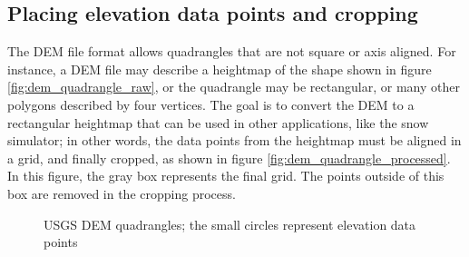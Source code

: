 \subsection{Placing elevation data points and cropping}
\label{sec:usgscropping}
The DEM file format allows quadrangles that are not square or axis aligned. For instance, a DEM file may describe a heightmap of the shape shown in figure \ref{fig:dem_quadrangle_raw}, or the quadrangle may be rectangular, or many other polygons described by four vertices. The goal is to convert the DEM to a rectangular heightmap that can be used in other applications, like the snow simulator; in other words, the data points from the heightmap must be aligned in a grid, and finally cropped, as shown in figure \ref{fig:dem_quadrangle_processed}. In this figure, the gray box represents the final grid. The points outside of this box are removed in the cropping process.

\begin{figure}[ht]
\centering
{}
\qquad
{}
\caption{USGS DEM quadrangles; the small circles represent elevation data points}
\label{fig:dem_quadrangle}
\end{figure}

